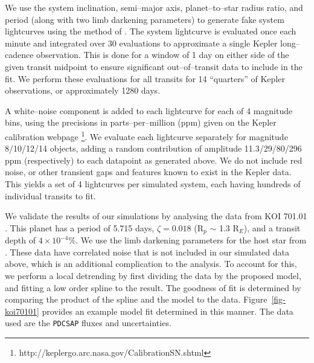 \medskip
{\centerline{}}
\smallskip


We use the system inclination, semi--major axis, planet--to--star
radius ratio, and period (along with two limb darkening parameters) to
generate fake system lightcurves using the method of
\cite{2002ApJ...580L.171M}.  The system lightcurve is evaluated once
each minute and integrated over 30 evaluations to approximate a single
Kepler long--cadence observation.  This is done for a window of 1 day
on either side of the given transit midpoint to ensure significant
out--of--transit data to include in the fit.  We perform these
evaluations for all transits for 14 ``quarters'' of Kepler
observations, or approximately 1280 days.

A white--noise component is added to each lightcurve for each of 4
magnitude bins, using the precisions in parts--per--million (ppm)
given on the Kepler calibration
webpage \footnote{http://keplergo.arc.nasa.gov/CalibrationSN.shtml}.
We evaluate each lightcurve separately for magnitude 8/10/12/14
objects, adding a random contribution of amplitude 11.3/29/80/296 ppm
(respectively) to each datapoint as generated above.  We do not
include red noise, or other transient gaps and features known to exist
in the Kepler data.  This yields a set of 4 lightcurves per simulated
system, each having hundreds of individual transits to fit.

\medskip
{\centerline{}}
\smallskip

We validate the results of our simulations by analysing the data from
KOI 701.01 \citep[Kepler 62--b;][]{2013arXiv1304.7387B}.  This planet
has a period of 5.715 days, $\zeta = 0.018$ (R$_p$ $\sim$ 1.3 R$_E$),
and a transit depth of $4 \times 10^{-4}$\%.  We use the limb
darkening parameters for the host star from
\cite{2010A&A...510A..21S}.  These data have correlated noise that is
not included in our simulated data above, which is an additional
complication to the analysis.  To account for this, we perform a local
detrending by first dividing the data by the proposed model, and
fitting a low order spline to the result.  The goodness of fit is
determined by comparing the product of the spline and the model to the
data.  Figure~\ref{fig-koi70101} provides an example model fit determined in
this manner.  The data used are the {\tt PDCSAP} fluxes and
uncertainties.

